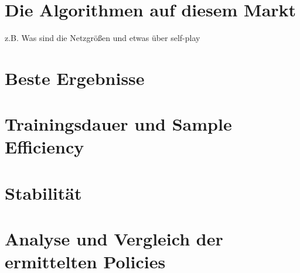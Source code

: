 \section{Die Algorithmen auf diesem Markt}
z.B. Was sind die Netzgrößen und etwas über self-play

\section{Beste Ergebnisse}

\section{Trainingsdauer und Sample Efficiency}

\section{Stabilität}

\section{Analyse und Vergleich der ermittelten Policies}
